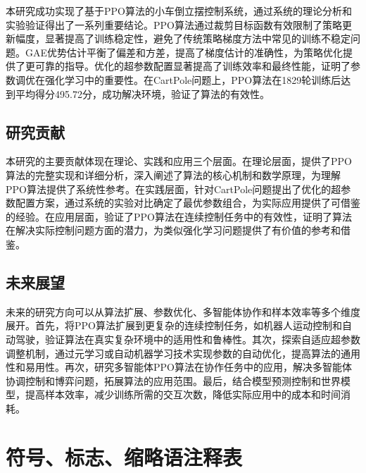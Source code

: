 \documentclass[12pt,a4paper]{article}
\begin{document}
本研究成功实现了基于PPO算法的小车倒立摆控制系统，通过系统的理论分析和实验验证得出了一系列重要结论。PPO算法通过裁剪目标函数有效限制了策略更新幅度，显著提高了训练稳定性，避免了传统策略梯度方法中常见的训练不稳定问题。GAE优势估计平衡了偏差和方差，提高了梯度估计的准确性，为策略优化提供了更可靠的指导。优化的超参数配置显著提高了训练效率和最终性能，证明了参数调优在强化学习中的重要性。在CartPole问题上，PPO算法在1829轮训练后达到平均得分495.72分，成功解决环境，验证了算法的有效性。

\subsection{研究贡献}

本研究的主要贡献体现在理论、实践和应用三个层面。在理论层面，提供了PPO算法的完整实现和详细分析，深入阐述了算法的核心机制和数学原理，为理解PPO算法提供了系统性参考。在实践层面，针对CartPole问题提出了优化的超参数配置方案，通过系统的实验对比确定了最优参数组合，为实际应用提供了可借鉴的经验。在应用层面，验证了PPO算法在连续控制任务中的有效性，证明了算法在解决实际控制问题方面的潜力，为类似强化学习问题提供了有价值的参考和借鉴。

\subsection{未来展望}

未来的研究方向可以从算法扩展、参数优化、多智能体协作和样本效率等多个维度展开。首先，将PPO算法扩展到更复杂的连续控制任务，如机器人运动控制和自动驾驶，验证算法在真实复杂环境中的适用性和鲁棒性。其次，探索自适应超参数调整机制，通过元学习或自动机器学习技术实现参数的自动优化，提高算法的通用性和易用性。再次，研究多智能体PPO算法在协作任务中的应用，解决多智能体协调控制和博弈问题，拓展算法的应用范围。最后，结合模型预测控制和世界模型，提高样本效率，减少训练所需的交互次数，降低实际应用中的成本和时间消耗。

\newpage

\section*{符号、标志、缩略语注释表}

\songti\fontsize{10.5pt}{16pt}\selectfont
\end{document}
